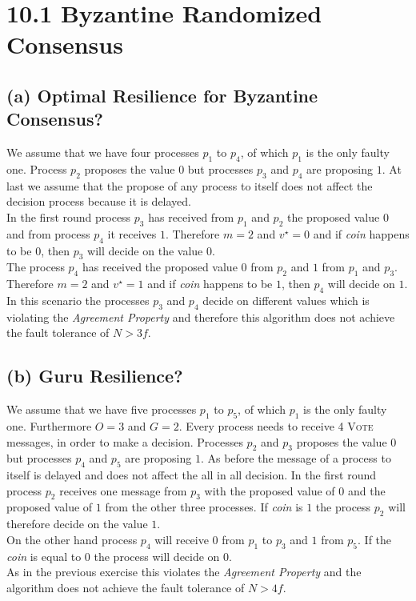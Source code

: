 \documentclass{article}
\begin{document}
	\pagestyle{fancy}
	\section*{10.1 Byzantine Randomized Consensus}
	\begin{adjustwidth}{2em}{2em}
		\subsection*{(a) Optimal Resilience for Byzantine Consensus?}
		\begin{adjustwidth}{2em}{2em}
			We assume that we have four processes $p_1$ to $p_4$, of which $p_1$ is the only faulty one. Process $p_2$ proposes the value $0$ but processes $p_3$ and $p_4$ are proposing $1$. At last we assume that the propose of any process to itself does not affect the decision process because it is delayed. \\
			In the first round process $p_3$ has received from $p_1$ and $p_2$ the proposed value $0$ and from process $p_4$ it receives $1$. Therefore $m=2$ and $v^{\star} = 0$ and if \textit{coin} happens to be $0$, then $p_3$ will decide on the value $0$. \\
			The process $p_4$ has received the proposed value $0$ from $p_2$ and $1$ from $p_1$ and $p_3$. Therefore $m=2$ and $v^{\star}=1$ and if \textit{coin} happens to be $1$, then $p_4$ will decide on $1$. \\
			In this scenario the processes $p_3$ and $p_4$ decide on different values which is violating the \textit{Agreement Property} and therefore this algorithm does not achieve the fault tolerance of $N > 3f$.
		\end{adjustwidth}
		\subsection*{(b) Guru Resilience?}
		\begin{adjustwidth}{2em}{2em}
			We assume that we have five processes $p_1$ to $p_5$, of which $p_1$ is the only faulty one. Furthermore $O=3$ and $G=2$. Every process needs to receive 4 \textsc{Vote} messages, in order to make a decision. Processes $p_2$ and $p_3$ proposes the value $0$ but processes $p_4$ and $p_5$ are proposing $1$. As before the message of a process to itself is delayed and does not affect the all in all decision. 
			In the first round process $p_2$ receives one message from $p_3$ with the proposed value of $0$ and the proposed value of $1$ from the other three processes. If \textit{coin} is $1$ the process $p_2$ will therefore decide on the value $1$. \\
			On the other hand process $p_4$ will receive $0$ from $p_1$ to $p_3$ and $1$ from $p_5$. If the \textit{coin} is equal to $0$ the process will decide on $0$. \\
			As in the previous exercise this violates the \textit{Agreement Property} and the algorithm does not achieve the fault tolerance of $N > 4f$.
		\end{adjustwidth}

\end{adjustwidth}
\end{document}

